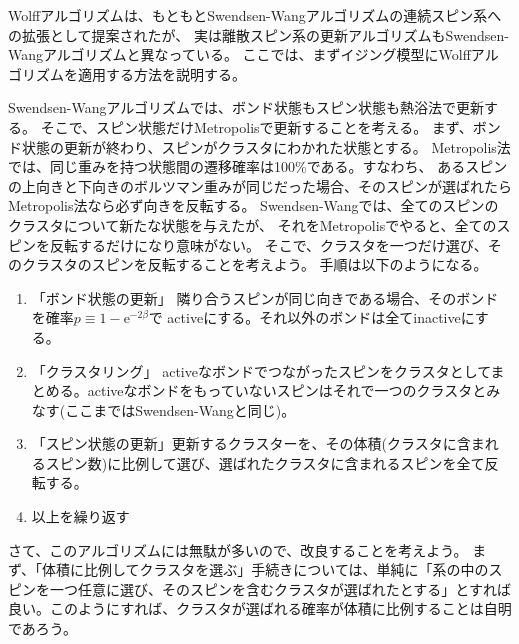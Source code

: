 \documentclass{jarticle}
\begin{document}
Wolffアルゴリズム\cite{Wolff}は、もともとSwendsen-Wangアルゴリズムの連続スピン系への拡張として提案されたが、
実は離散スピン系の更新アルゴリズムもSwendsen-Wangアルゴリズムと異なっている。
ここでは、まずイジング模型にWolffアルゴリズムを適用する方法を説明する。

Swendsen-Wangアルゴリズムでは、ボンド状態もスピン状態も熱浴法で更新する。
そこで、スピン状態だけMetropolisで更新することを考える。
まず、ボンド状態の更新が終わり、スピンがクラスタにわかれた状態とする。
Metropolis法では、同じ重みを持つ状態間の遷移確率は100\%である。すなわち、
あるスピンの上向きと下向きのボルツマン重みが同じだった場合、そのスピンが選ばれたら
Metropolis法なら必ず向きを反転する。
Swendsen-Wangでは、全てのスピンのクラスタについて新たな状態を与えたが、
それをMetropolisでやると、全てのスピンを反転するだけになり意味がない。
そこで、クラスタを一つだけ選び、そのクラスタのスピンを反転することを考えよう。
手順は以下のようになる。

\begin{enumerate}
  \item 「ボンド状態の更新」 隣り合うスピンが同じ向きである場合、そのボンドを確率$p \equiv 1 - \mathrm{e}^{-2 \beta}$で
        activeにする。それ以外のボンドは全てinactiveにする。
  \item 「クラスタリング」 activeなボンドでつながったスピンをクラスタとしてまとめる。activeなボンドをもっていないスピンはそれで一つのクラスタとみなす(ここまではSwendsen-Wangと同じ)。
  \item 「スピン状態の更新」更新するクラスターを、その体積(クラスタに含まれるスピン数)に比例して選び、選ばれたクラスタに含まれるスピンを全て反転する。
  \item 以上を繰り返す
\end{enumerate}
さて、このアルゴリズムには無駄が多いので、改良することを考えよう。
まず、「体積に比例してクラスタを選ぶ」手続きについては、単純に「系の中のスピンを一つ任意に選び、そのスピンを含むクラスタが選ばれたとする」とすれば良い。このようにすれば、クラスタが選ばれる確率が体積に比例することは自明であろう。
\end{document}
